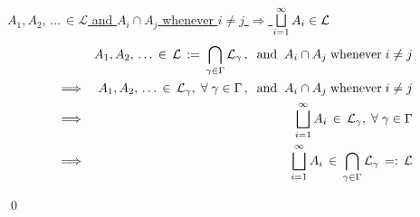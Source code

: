 \begin{enumerate}
	\vskip 0.1cm
	\noindent
	\underline{$A_{1}, A_{2},\,\ldots\, \in \mathcal{L}$
	\;and\; $A_{i} \cap A_{j}$ whenever $i \neq j$
	\;\;$\Longrightarrow$\;\;
	$\overset{\infty}{\underset{i=1}{\textnormal{\large$\bigsqcup$}}}\,A_{i} \in \mathcal{L}$}
	\begin{eqnarray*}
	&& A_{1},A_{2},\,\ldots \,\in\, \mathcal{L} \, := \, \bigcap_{\gamma\in\Gamma}\mathcal{L}_{\gamma}\,,
	\;\;\textnormal{and}\;\;A_{i} \cap A_{j} \;\textnormal{whenever}\; i \neq j
	\\
	&\Longrightarrow&
		A_{1},A_{2},\,\ldots \, \in \, \mathcal{L}_{\gamma},\;\forall\;\gamma \in \Gamma\,,
		\;\;\textnormal{and}\;\;A_{i} \cap A_{j} \;\textnormal{whenever}\; i \neq j
	\\
	&\Longrightarrow& \overset{\infty}{\underset{i=1}{\bigsqcup}}\,A_{i} \, \in \, \mathcal{L}_{\gamma},\;\forall\;\gamma \in \Gamma
	\\
	&\Longrightarrow& \overset{\infty}{\underset{i=1}{\bigsqcup}}\,A_{i} \, \in \, \bigcap_{\gamma\in\Gamma}\mathcal{L}_{\gamma} \, =: \, \mathcal{L}
	\end{eqnarray*}	
\end{enumerate}
\qed

